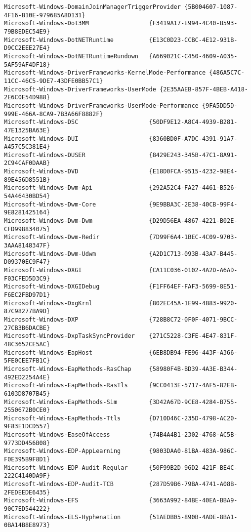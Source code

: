 \documentclass{report}
\begin{document}
\begin{lstlisting}[breaklines=true,basicstyle=\tiny]
Microsoft-Windows-DomainJoinManagerTriggerProvider {5B004607-1087-4F16-B10E-979685A8D131}
Microsoft-Windows-Dot3MM                 {F3419A17-E994-4C40-B593-79B8EDEC54E9}
Microsoft-Windows-DotNETRuntime          {E13C0D23-CCBC-4E12-931B-D9CC2EEE27E4}
Microsoft-Windows-DotNETRuntimeRundown   {A669021C-C450-4609-A035-5AF59AF4DF18}
Microsoft-Windows-DriverFrameworks-KernelMode-Performance {486A5C7C-11CC-46C5-9DE7-43DFE0BB57C1}
Microsoft-Windows-DriverFrameworks-UserMode {2E35AAEB-857F-4BEB-A418-2E6C0E54D988}
Microsoft-Windows-DriverFrameworks-UserMode-Performance {9FA5DD5D-999E-466A-8CA9-7B3A66F8882F}
Microsoft-Windows-DSC                    {50DF9E12-A8C4-4939-B281-47E1325BA63E}
Microsoft-Windows-DUI                    {8360BD0F-A7DC-4391-91A7-A457C5C381E4}
Microsoft-Windows-DUSER                  {8429E243-345B-47C1-8A91-2C94CAF0DAAB}
Microsoft-Windows-DVD                    {E18D0FCA-9515-4232-98E4-89E456D8551B}
Microsoft-Windows-Dwm-Api                {292A52C4-FA27-4461-B526-54A46430BD54}
Microsoft-Windows-Dwm-Core               {9E9BBA3C-2E38-40CB-99F4-9E8281425164}
Microsoft-Windows-Dwm-Dwm                {D29D56EA-4867-4221-B02E-CFD998834075}
Microsoft-Windows-Dwm-Redir              {7D99F6A4-1BEC-4C09-9703-3AAA8148347F}
Microsoft-Windows-Dwm-Udwm               {A2D1C713-093B-43A7-B445-D09370EC9F47}
Microsoft-Windows-DXGI                   {CA11C036-0102-4A2D-A6AD-F03CFED5D3C9}
Microsoft-Windows-DXGIDebug              {F1FF64EF-FAF3-5699-8E51-F6EC2FBD97D1}
Microsoft-Windows-DxgKrnl                {802EC45A-1E99-4B83-9920-87C98277BA9D}
Microsoft-Windows-DXP                    {728B8C72-0F0F-4071-9BCC-27CB3B6DACBE}
Microsoft-Windows-DxpTaskSyncProvider    {271C5228-C3FE-4E47-831F-48C3652CE5AC}
Microsoft-Windows-EapHost                {6EB8DB94-FE96-443F-A366-5FE0CEE7FB1C}
Microsoft-Windows-EapMethods-RasChap     {58980F4B-BD39-4A3E-B344-492ED2254A4E}
Microsoft-Windows-EapMethods-RasTls      {9CC0413E-5717-4AF5-82EB-6103D8707B45}
Microsoft-Windows-EapMethods-Sim         {3D42A67D-9CE8-4284-B755-2550672B0CE0}
Microsoft-Windows-EapMethods-Ttls        {D710D46C-235D-4798-AC20-9F83E1DCD557}
Microsoft-Windows-EaseOfAccess           {74B4A4B1-2302-4768-AC5B-9773DD456B08}
Microsoft-Windows-EDP-AppLearning        {9803DAA0-81BA-483A-986C-F0E395B9F8D1}
Microsoft-Windows-EDP-Audit-Regular      {50F99B2D-96D2-421F-BE4C-222C4140DA9F}
Microsoft-Windows-EDP-Audit-TCB          {287D59B6-79BA-4741-A08B-2FEDEEDE6435}
Microsoft-Windows-EFS                    {3663A992-84BE-40EA-BBA9-90C7ED544222}
Microsoft-Windows-ELS-Hyphenation        {51AEDB05-890B-4ADE-8BA1-0BA14B8E8973}

\end{lstlisting}
\end{document}
